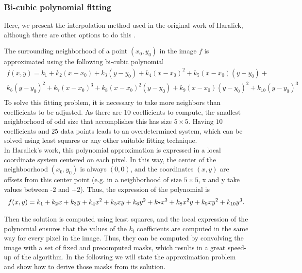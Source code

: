 \documentclass{ipol}
\numberwithin{equation}{section}
\numberwithin{table}{section}
\begin{document}

\subsubsection{Bi-cubic polynomial fitting}
\label{sec:bicubic}

Here, we present the interpolation method used in the original work of Haralick, although there are other options to do this \cite{getreuer}. 

\myn{\label{second:haralick:fitting:statement}} The surrounding neighborhood of a point $(x_0,y_0)$ in the image $f$ is approximated using the following bi-cubic polynomial
\begin{align}
	\label{eq:bicubic:long}
	f(x,y) = k_1 + k_2 (x-x_0) + k_3(y-y_0) + k_4(x-x_0)^2 + k_5(x-x_0)(y-y_0)  +\\
	 k_6(y-y_0) ^2 + k_7(x-x_0)^3 + k_8(x-x_0)^2(y-y_0)  + k_9(x-x_0)(y-y_0) ^2 + k_{10}(y-y_0) ^3 \\
\end{align}
To solve this fitting problem, it is necessary to take more neighbors than coefficients to be adjusted. As there are 10 coefficients to compute, the smallest neighborhood of odd size that accomplishes this has size $5\times5$. Having $10$ coefficients and $25$ data 
points leads to an overdetermined system, which can be solved using least squares or any other suitable fitting technique.\\

In Haralick's work, this polynomial approximation is expressed in a local coordinate system centered on each pixel. In this way, the center of the neighboorhood $(x_0,y_0)$ is always $(0,0)$, and the coordinates $(x, y)$ are offsets from this center point (e.g. in a neighborhood of size $5\times5$, x and y take values between -2 and +2). Thus, the expression of the polynomial is\\

\begin{equation}
	\label{eq:bicubic}
	f(x,y) = k_1 + k_2x + k_3y + k_4x^2 + k_5xy + k_6y^2 + k_7x^3 + k_8x^2y + k_9xy^2 + k_{10}y^3. \\
\end{equation}


Then the solution is computed using least squares, and the local expression of the polynomial ensures that the values of the $k_i$ coefficients are computed in the same way for every pixel in the image. Thus, they can be computed by convolving the image with a set of fixed and precomputed masks, which results in a great speed-up of the algorithm. In the following we will state the approximation problem and show how to derive those masks from its solution.\\
\end{document}
